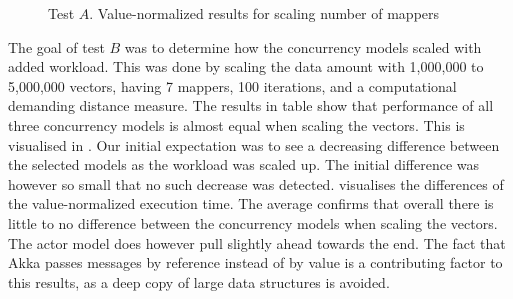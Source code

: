 \begin{figure}[h]
\centering
\dataset
{}
\caption{Test $A$. Value-normalized results for scaling number of mappers}\label{fig:value_norm_testa}
\end{figure}
%
The goal of test $B$ was to determine how the concurrency models scaled with added workload. This was done by scaling the data amount with 1,000,000 to 5,000,000 vectors, having 7 mappers, 100 iterations, and a computational demanding distance measure. The results in table  show that performance of all three concurrency models is almost equal when scaling the vectors. This is visualised in . Our initial expectation was to see a decreasing difference between the selected models as the workload was scaled up. The initial difference was however so small that no such decrease was detected.   visualises the differences of the value-normalized execution time. The average confirms that overall there is little to no difference between the concurrency models when scaling the vectors. The actor model does however pull slightly ahead towards the end. The fact that Akka passes messages by reference instead of by value is a contributing factor to this results, as a deep copy of large data structures is avoided. 
